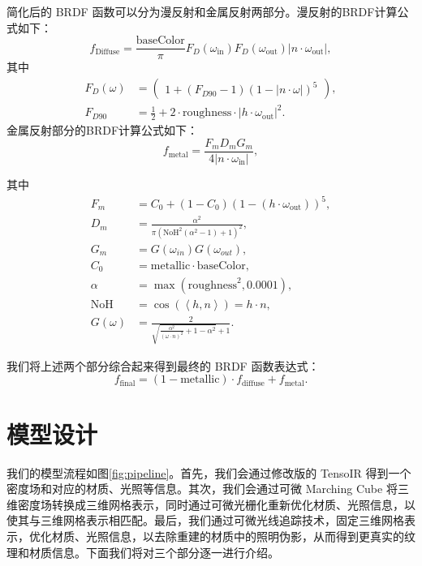 \newpage
简化后的 BRDF 函数可以分为漫反射和金属反射两部分。漫反射的BRDF计算公式如下：
\begin{equation}
  f_{\text{Diffuse}} = \frac{\text{baseColor}}{\pi}F_{D}(\omega_{\text{in}})F_{D}(\omega_{\text{out}})|n\cdot\omega_{\text{out}}|,
\end{equation}
其中
\begin{align}
  F_{D}(\omega) &=\begin{pmatrix}1+(F_{D90}-1)(1-|n\cdot\omega|)^5\end{pmatrix}, \\
  F_{D90} &=\frac12+2\cdot\mathrm{roughness}\cdot|h\cdot\omega_{\mathrm{out}}|^2.
\end{align}
金属反射部分的BRDF计算公式如下：
\begin{equation}
  f_\mathrm{metal}=\frac{F_mD_mG_m}{4|n\cdot\omega_\mathrm{in}|},
\end{equation}

其中
\begin{align}
  F_{m} &= C_0+\left(1-C_0\right)\left(1-(h\cdot\omega_{\mathrm{out}})\right)^5,\\
D_{m} &= \frac {\alpha ^ 2} {\pi \left(\mathrm{NoH}^2 (\alpha^2 - 1) + 1\right)^2}, \\
G_{m} &= G(\omega_{in}) G(\omega_{out}),\\
C_0 &= \mathrm{metallic}\cdot\mathrm{baseColor},\\
\alpha &= \max (\mathrm{roughness}^2, 0.0001),\\
\mathrm{NoH}&= \cos (\left<h, n\right>) = h \cdot n,\\
G(\omega) &= \frac 2 {\sqrt{\frac {\alpha^2} {(\omega \cdot n)^2} + 1 - \alpha^2 }+1}.
\end{align}

我们将上述两个部分综合起来得到最终的 BRDF 函数表达式：
\begin{equation}
  f_{\mathrm{final}}=(1-\text{metallic})\cdot f_\text{diffuse}+f_\text{metal}.
\end{equation}

\section{模型设计}

我们的模型流程如图\ref{fig:pipeline}。首先，我们会通过修改版的 TensoIR\cite{tensoir} 得到一个密度场和对应的材质、光照等信息。其次，我们会通过可微 Marching Cube 将三维密度场转换成三维网格表示，同时通过可微光栅化重新优化材质、光照信息，以使其与三维网格表示相匹配。最后，我们通过可微光线追踪技术，固定三维网格表示，优化材质、光照信息，以去除重建的材质中的照明伪影，从而得到更真实的纹理和材质信息。下面我们将对三个部分逐一进行介绍。

